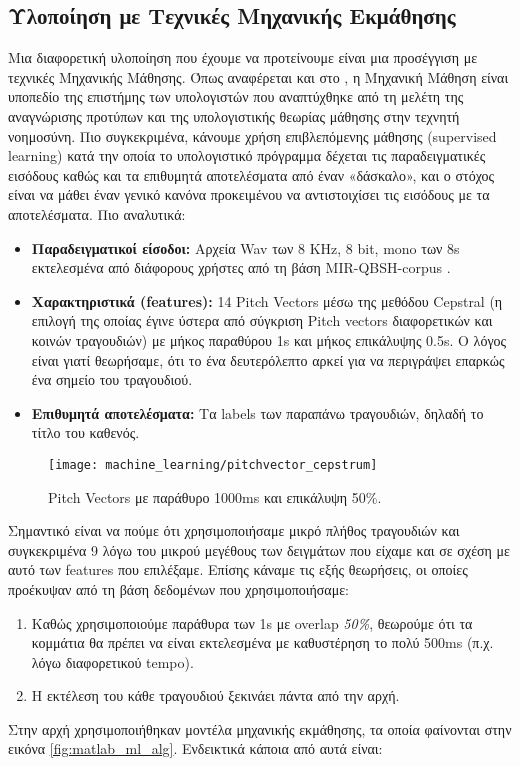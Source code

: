 \subsection{Υλοποίηση με Τεχνικές Μηχανικής Εκμάθησης}
Μια διαφορετική υλοποίηση που έχουμε να προτείνουμε είναι μια προσέγγιση με τεχνικές Μηχανικής Μάθησης. Όπως αναφέρεται και στο \cite{mldef}, η Μηχανική Μάθηση είναι υποπεδίο της επιστήμης των υπολογιστών που αναπτύχθηκε από τη μελέτη της αναγνώρισης προτύπων και της  υπολογιστικής θεωρίας μάθησης στην τεχνητή νοημοσύνη. Πιο συγκεκριμένα, κάνουμε χρήση επιβλεπόμενης μάθησης (supervised learning) κατά την οποία το υπολογιστικό πρόγραμμα δέχεται τις παραδειγματικές εισόδους καθώς και τα επιθυμητά αποτελέσματα από έναν «δάσκαλο», και ο στόχος είναι να μάθει έναν γενικό κανόνα προκειμένου να αντιστοιχίσει τις εισόδους με τα αποτελέσματα.
Πιο αναλυτικά:
\begin{itemize}
  \item \textbf{Παραδειγματικοί είσοδοι:} Αρχεία Wav των 8 KHz, 8 bit, mono των 8s εκτελεσμένα από διάφορους χρήστες από τη βάση MIR-QBSH-corpus \cite{jang-dataset}.
  \item \textbf{Χαρακτηριστικά (features):} 14 Pitch Vectors μέσω της μεθόδου Cepstral\cite{cepstral} (η επιλογή της οποίας έγινε ύστερα από σύγκριση Pitch vectors διαφορετικών και κοινών τραγουδιών) με μήκος παραθύρου 1s και μήκος επικάλυψης 0.5s. Ο λόγος είναι γιατί θεωρήσαμε, ότι το ένα δευτερόλεπτο αρκεί για να περιγράψει επαρκώς ένα σημείο του τραγουδιού.
  \item \textbf{Επιθυμητά αποτελέσματα:} Τα labels των παραπάνω τραγουδιών, δηλαδή το τίτλο του καθενός.
\end{itemize}

\begin{figure}
        \centering
        \vspace{-20pt}\texttt{[image: machine\_learning/pitchvector\_cepstrum]}
        \vspace{-20pt}\caption{Pitch Vectors με παράθυρο 1000ms και επικάλυψη 50\%.}
        \label{fig:pvcepstrum}
\end{figure}

Σημαντικό είναι να πούμε ότι χρησιμοποιήσαμε μικρό πλήθος τραγουδιών και συγκεκριμένα 9 λόγω του μικρού μεγέθους των δειγμάτων που είχαμε και σε σχέση με αυτό των features που επιλέξαμε. Επίσης κάναμε τις εξής θεωρήσεις, οι οποίες προέκυψαν από τη βάση δεδομένων που χρησιμοποιήσαμε:
\begin{enumerate}
  \item Καθώς χρησιμοποιούμε παράθυρα των 1s με overlap \textit{50\%}, θεωρούμε ότι τα κομμάτια θα πρέπει να είναι εκτελεσμένα με καθυστέρηση το πολύ 500ms (π.χ. λόγω διαφορετικού tempo).
  \item Η εκτέλεση του κάθε τραγουδιού ξεκινάει πάντα από την αρχή.
\end{enumerate}
Στην αρχή χρησιμοποιήθηκαν μοντέλα μηχανικής εκμάθησης, τα οποία φαίνονται στην εικόνα \ref{fig:matlab_ml_alg}. Ενδεικτικά κάποια από αυτά είναι: 

